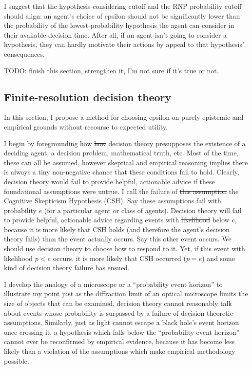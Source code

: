 \documentclass{article}
\providecommand{\DIFadd}[1]{{\protect\color{blue}\uwave{#1}}} %
\providecommand{\DIFdel}[1]{{\protect\color{red}\sout{#1}}}                      %
\providecommand{\DIFaddbegin}{} %
\providecommand{\DIFaddend}{} %
\providecommand{\DIFdelbegin}{} %
\providecommand{\DIFdelend}{} %
\begin{document}
I suggest that the hypothesis-considering cutoff and the RNP probability cutoff should align: an agent's choice of epsilon should not be significantly lower than the probability of the lowest-probability hypothesis the agent can consider in their available decision time. After all, if an agent isn't going to consider a hypothesis, they can hardly motivate their actions by appeal to that hypothesis' consequences.

TODO: finish this section, strengthen it, I'm not sure if it's true or not.

\subsection{Finite-resolution decision theory}

In this section, I propose a method for choosing epsilon on purely epistemic and empirical grounds without recourse to expected utility. 

I begin by foregrounding how \DIFdelbegin \DIFdel{how }\DIFdelend decision theory presupposes the existence of a deciding agent, a decision problem, mathematical truth, etc. Most of the time, these can all be assumed, however skeptical and empirical reasoning implies there is always a tiny non-negative chance that these conditions fail to hold. Clearly, decision theory would fail to provide helpful, actionable advice if these foundational assumptions were untrue. I call the failure of \DIFdelbegin \DIFdel{this assumption }\DIFdelend \DIFaddbegin \DIFadd{these assumptions }\DIFaddend the Cognitive Skepticism Hypothesis (CSH). Say these assumptions fail with probability \(e\) (for a particular agent or class of agents). Decision theory will fail to provide helpful, actionable advice regarding events with \DIFdelbegin \DIFdel{likelihood }\DIFdelend \DIFaddbegin \DIFadd{probability }\DIFaddend below \(e\), because it is more likely that CSH holds (and therefore the agent's decision theory fails) than the event actually occurs. Say this other event occurs. We should use decision theory to choose how to respond to it. Yet, if this event with likelihood \(p<e\) occurs, it is more likely that CSH occurred (\(p=e\)) and some kind of decision theory failure has ensued.

I develop the analogy of a microscope or a ``probability event horizon'' to illustrate my point \textemdash{} just as the diffraction limit of an optical microscope limits the size of objects that can be examined, decision theory cannot reasonably talk about events whose probability is surpassed by a failure of decision theoretic assumptions. Similarly, just as light cannot escape a black hole's event horizon once crossing it, a hypothesis which falls below the ``probability event horizon'' cannot ever be reconfirmed by empirical evidence, because it has become less likely than a violation of the assumptions which make empirical methodology possible. 
\end{document}
